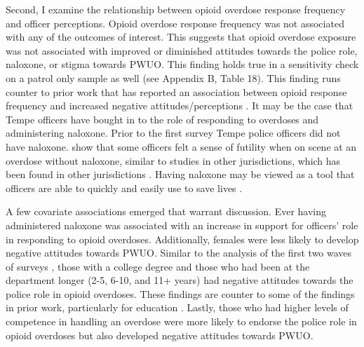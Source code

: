 Second, I examine the relationship between opioid overdose response frequency and officer perceptions. Opioid overdose response frequency was not associated with any of the outcomes of interest. This suggests that opioid overdose exposure was not associated with improved or diminished attitudes towards the police role, naloxone, or stigma towards PWUO. This finding holds true in a sensitivity check on a patrol only sample as well (see Appendix B, Table 18). This finding runs counter to prior work that has reported an association between opioid response frequency and increased negative attitudes/perceptions \parencite{carroll_knowledge_2020, murphy_police_2020, murphy_police_2021}. It may be the case that Tempe officers have bought in to the role of responding to overdoses and administering naloxone. Prior to the first survey Tempe police officers did not have naloxone. \textcite{white_moving_2021} show that some officers felt a sense of futility when on scene at an overdose without naloxone, similar to studies in other jurisdictions, which has been found in other jurisdictions \parencite{smiley-mcdonald_perspectives_2022}. Having naloxone may be viewed as a tool that officers are able to quickly and easily use to save lives \parencite{lloyd_its_2023}. 

A few covariate associations emerged that warrant discussion. Ever having administered naloxone was associated with an increase in support for officers' role in responding to opioid overdoses. Additionally, females were less likely to develop negative attitudes towards PWUO. Similar to the analysis of the first two waves of surveys \parencite{white_narcan_2021}, those with a college degree and those who had been at the department longer (2-5, 6-10, and 11+ years) had negative attitudes towards the police role in opioid overdoses. These findings are counter to some of the findings in prior work, particularly for education \parencite{jorgensen_badges_2018}. Lastly, those who had higher levels of competence in handling an overdose were more likely to endorse the police role in opioid overdoses but also developed negative attitudes towards PWUO. 

